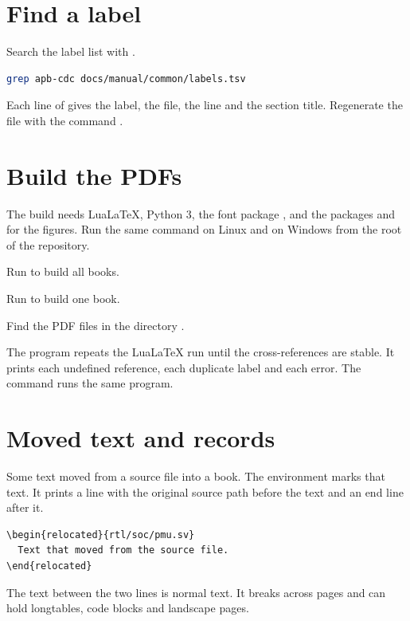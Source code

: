 \section{Find a label}
Search the label list with .
\begin{lstlisting}[language=bash]
grep apb-cdc docs/manual/common/labels.tsv
\end{lstlisting}
Each line of  gives the label, the file, the line and the section title. Regenerate the file with the command .

\section{Build the PDFs}
The build needs LuaLaTeX, Python 3, the font package , and the packages  and  for the figures. Run the same command on Linux and on Windows from the root of the repository.
\begin{procedure}
  \item Run  to build all books.
  \item Run  to build one book.
  \item Find the PDF files in the directory .
\end{procedure}
The program repeats the LuaLaTeX run until the cross-references are stable. It prints each undefined reference, each duplicate label and each error. The command  runs the same program.

\section{Moved text and records}
Some text moved from a source file into a book. The environment  marks that text. It prints a line with the original source path before the text and an end line after it.
\begin{lstlisting}[language={[LaTeX]TeX}]
\begin{relocated}{rtl/soc/pmu.sv}
  Text that moved from the source file.
\end{relocated}
\end{lstlisting}
The text between the two lines is normal text. It breaks across pages and can hold longtables, code blocks and landscape pages.

